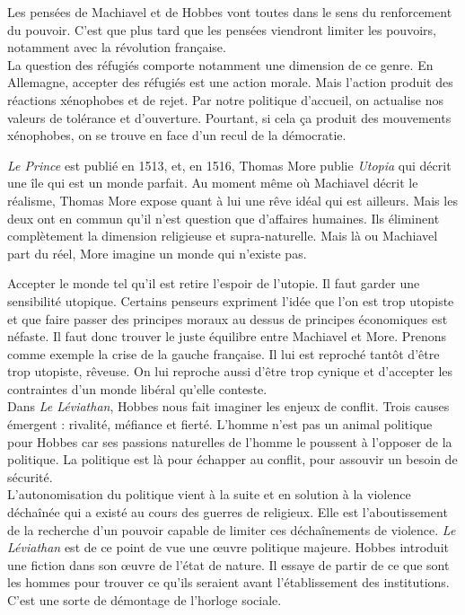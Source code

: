 \documentclass[a4paper,11pt]{article}
\begin{document}
	Les pensées de Machiavel et de Hobbes vont toutes dans le sens du renforcement du pouvoir. C’est que plus tard que les pensées viendront limiter les pouvoirs, notamment avec la révolution française.\\

	
	La question des réfugiés comporte notamment une dimension de ce genre. En Allemagne, accepter des réfugiés est une action morale. Mais l’action produit des réactions xénophobes et de rejet. Par notre politique d’accueil, on actualise nos valeurs de tolérance et d’ouverture. Pourtant, si cela ça produit des mouvements xénophobes, on se trouve en face d’un recul de la démocratie.
	
	\textit{Le Prince} est publié en 1513, et, en 1516, Thomas More publie \textit{Utopia} qui décrit une île qui est un monde parfait. Au moment même où Machiavel décrit le réalisme, Thomas More expose quant à lui une rêve idéal qui est ailleurs. Mais les deux ont en commun qu’il n’est question que d’affaires humaines. Ils éliminent complètement la dimension religieuse et supra-naturelle. Mais là ou Machiavel part du réel, More imagine un monde qui n'existe pas.
	
	Accepter le monde tel qu’il est retire l’espoir de l’utopie. Il faut garder une sensibilité utopique. Certains penseurs expriment l’idée que l’on est trop utopiste et que faire passer des principes moraux au dessus de principes économiques est néfaste. Il faut donc trouver le juste équilibre entre Machiavel et More. Prenons comme exemple la crise de la gauche française. Il lui est reproché tantôt d’être trop utopiste, rêveuse. On lui reproche aussi d’être trop cynique et d’accepter les contraintes d’un monde libéral qu’elle conteste.\\

	
	Dans \textit{Le Léviathan}, Hobbes nous fait imaginer les enjeux de conflit. Trois causes émergent : rivalité, méfiance et fierté.
	L’homme n’est pas un animal politique pour Hobbes car ses passions naturelles de l’homme le poussent à l’opposer de la politique.
	La politique est là pour échapper au conflit, pour assouvir un besoin de sécurité.\\

	
	L’autonomisation du politique vient à la suite et en solution à la violence déchaînée qui a existé au cours des guerres de religieux.
	Elle est l’aboutissement de la recherche d’un pouvoir capable de limiter ces déchaînements de violence.
	\textit{Le Léviathan} est de ce point de vue une œuvre politique majeure. Hobbes introduit une fiction dans son œuvre de l’état de nature.
	Il essaye de partir de ce que sont les hommes pour trouver ce qu’ils seraient avant l’établissement des institutions.
	C’est une sorte de démontage de l’horloge sociale.
\end{document}
